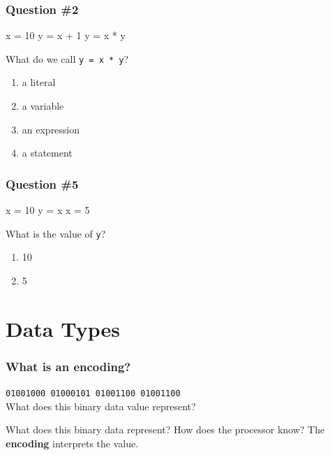 \documentclass[11pt]{beamer}
\begin{document}
\begin{frame}[fragile]
  \frametitle{Question \#2}
  \Enlarge

  \begin{semiverbatim}
x = 10
y = x + 1
y = x * y
  \end{semiverbatim}
  What do we call \texttt{y = x * y}?
  \begin{enumerate}[label=\Alph*]
  \item  a literal
  \item  a variable
  \item  an expression
  \item  a statement
  \end{enumerate}
\end{frame}

\begin{frame}[fragile]
  \frametitle{Question \#5}
  \Enlarge

  \begin{semiverbatim}
x = 10
y = x
x = 5
  \end{semiverbatim}
  What is the value of \texttt{y}?
  \begin{enumerate}[label=\Alph*]
  \item  10
  \item  5
  \end{enumerate}
\end{frame}

\section{Data Types}

\begin{frame}
  \frametitle{What is an \textbf{encoding}?}
  \Enlarge

  \texttt{01001000 01000101 01001100 01001100} \\
  What does this binary data value represent?
  \begin{itemize}
  \myitem  What does this binary data represent?
  \myitem  How does the processor know?
  \myitem  The \textbf{encoding} interprets the value.
  \end{itemize}
\end{frame}
\end{document}
